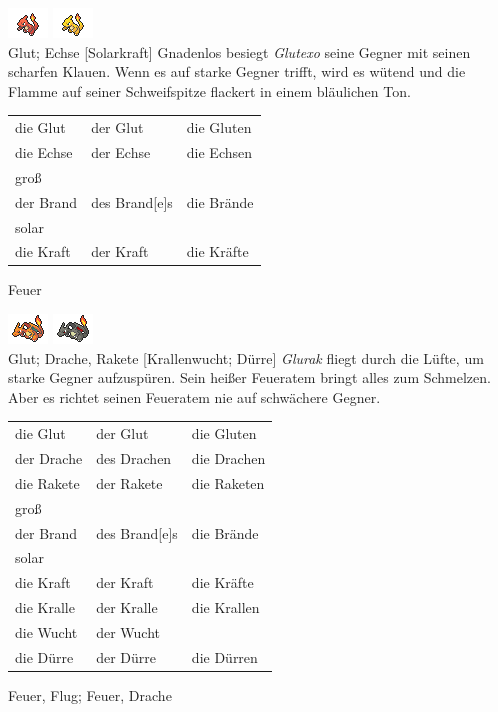 \documentclass[a7paper,10pt,grid=both
,toc
]{kartei}
\begin{document}
\begin{karte}[Großbrand]{
\includegraphics{../regular/charmeleon}
\includegraphics{../shiny/charmeleon} \\
Glut; Echse
}[Solarkraft]
Gnadenlos besiegt \emph{Glutexo} seine Gegner mit seinen scharfen Klauen. Wenn 
es auf starke Gegner trifft, wird es wütend und die Flamme auf seiner 
Schweifspitze flackert in einem bläulichen Ton.

\vspace{5pt}
\begin{tabular}{lll}
die Glut	&	der Glut	&	die Gluten \\
die Echse	&	der Echse	&	die Echsen \\
groß \\
der Brand	&	des Brand[e]s	&	die Brände \\
solar \\
die Kraft	&	der Kraft	&	die Kräfte \\
\end{tabular}
\vspace{5pt}

Feuer
\end{karte}


\begin{karte}{
\includegraphics{../regular/charizard}
\includegraphics{../shiny/charizard} \\
Glut; Drache, Rakete
}[Krallenwucht; Dürre]
\emph{Glurak} fliegt durch die Lüfte, um starke Gegner aufzuspüren. Sein heißer 
Feueratem bringt alles zum Schmelzen. Aber es richtet seinen Feueratem nie auf 
schwächere Gegner.

\vspace{5pt}
\begin{tabular}{lll}
die Glut	&	der Glut	&	die Gluten \\
der Drache	&	des Drachen	&	die Drachen \\
die Rakete	&	der Rakete	&	die Raketen	\\
groß \\
der Brand	&	des Brand[e]s	&	die Brände \\
solar \\
die Kraft	&	der Kraft	&	die Kräfte \\
die Kralle	&	der Kralle	&	die Krallen \\
die Wucht	&	der Wucht	&	 \\
die Dürre	&	der Dürre	&	die Dürren
\end{tabular}
\vspace{5pt}

Feuer, Flug; Feuer, Drache
\end{karte}
\end{document}
